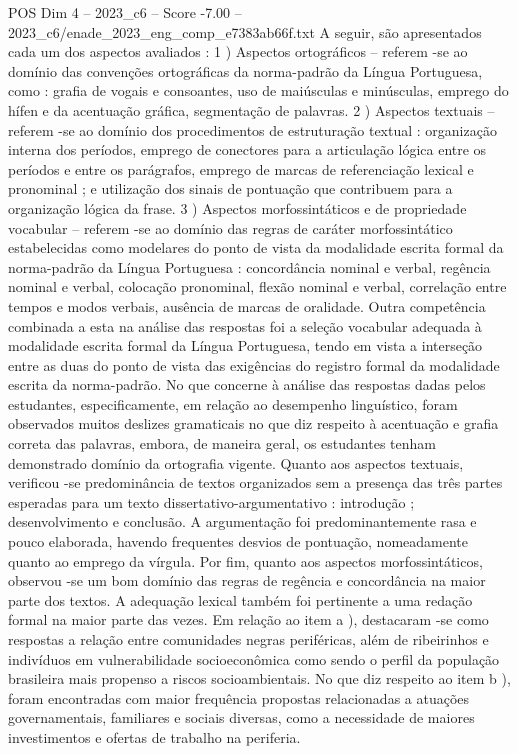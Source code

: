 \begin{textsample}{POS Dim 4 – 2023\_c6 – Score -7.00 – 2023\_c6/enade\_2023\_eng\_comp\_e7383ab66f.txt}
A seguir, são apresentados cada um dos aspectos avaliados : 1 ) Aspectos ortográficos – referem -se ao domínio das convenções ortográficas da norma-padrão da Língua Portuguesa, como : grafia de vogais e consoantes, uso de maiúsculas e minúsculas, emprego do hífen e da acentuação gráfica, segmentação de palavras. 2 ) Aspectos textuais – referem -se ao domínio dos procedimentos de estruturação textual : organização interna dos períodos, emprego de conectores para a articulação lógica entre os períodos e entre os parágrafos, emprego de marcas de referenciação lexical e pronominal ; e utilização dos sinais de pontuação que contribuem para a organização lógica da frase. 3 ) Aspectos morfossintáticos e de propriedade vocabular – referem -se ao domínio das regras de caráter morfossintático estabelecidas como modelares do ponto de vista da modalidade escrita formal da norma-padrão da Língua Portuguesa : concordância nominal e verbal, regência nominal e verbal, colocação pronominal, flexão nominal e verbal, correlação entre tempos e modos verbais, ausência de marcas de oralidade.
Outra competência combinada a esta na análise das respostas foi a seleção vocabular adequada à modalidade escrita formal da Língua Portuguesa, tendo em vista a interseção entre as duas do ponto de vista das exigências do registro formal da modalidade escrita da norma-padrão.
No que concerne à análise das respostas dadas pelos estudantes, especificamente, em relação ao desempenho linguístico, foram observados muitos deslizes gramaticais no que diz respeito à acentuação e grafia correta das palavras, embora, de maneira geral, os estudantes tenham demonstrado domínio da ortografia vigente.
Quanto aos aspectos textuais, verificou -se predominância de textos organizados sem a presença das três partes esperadas para um texto dissertativo-argumentativo : introdução ; desenvolvimento e conclusão.
A argumentação foi predominantemente rasa e pouco elaborada, havendo frequentes desvios de pontuação, nomeadamente quanto ao emprego da vírgula.
Por fim, quanto aos aspectos morfossintáticos, observou -se um bom domínio das regras de regência e concordância na maior parte dos textos.
A adequação lexical também foi pertinente a uma redação formal na maior parte das vezes.
Em relação ao item a ), destacaram -se como respostas a relação entre comunidades negras periféricas, além de ribeirinhos e indivíduos em vulnerabilidade socioeconômica como sendo o perfil da população brasileira mais propenso a riscos socioambientais.
No que diz respeito ao item b ), foram encontradas com maior frequência propostas relacionadas a atuações governamentais, familiares e sociais diversas, como a necessidade de maiores investimentos e ofertas de trabalho na periferia.

\end{textsample}
